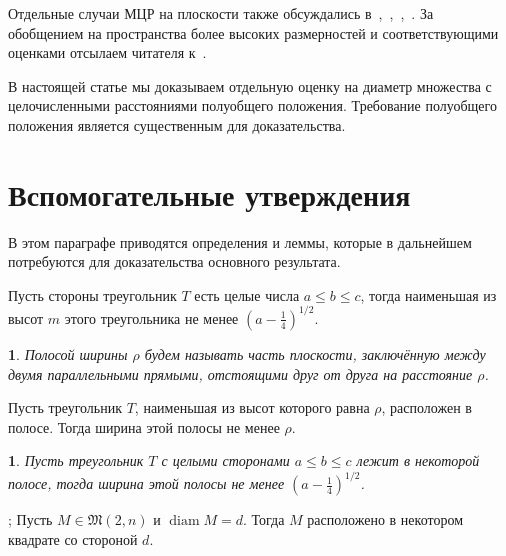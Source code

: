 \documentclass[11pt,twoside,draft
]{article}
\newtheorem{Definition}{\indent {\sc Definition}}
\newtheorem{Corollary}{\indent {\sc Corollary}}
\begin{document}
Отдельные случаи МЦР на плоскости также обсуждались
в~\cite[\S 5.11]{brass2006research},~\cite[\S D20]{guy2013unsolved},~\cite{our-pmm-2018},~\cite{our-ped-2018}.
За обобщением на пространства более высоких размерностей и соответствующими оценками
отсылаем читателя к~\cite{kurz2005characteristic,nozaki2013lower}.

В настоящей статье мы доказываем отдельную оценку на диаметр множества с целочисленными расстояниями полуобщего положения.
Требование полуобщего положения является существенным для доказательства.



\section{Вспомогательные утверждения}

В этом параграфе приводятся определения и леммы, которые в дальнейшем потребуются
для доказательства основного результата.


\begin{lemma}
	\cite[Наблюдение 1]{solymosi2003note}
	Пусть стороны треугольник $T$ есть целые числа $a \leq b \leq c$,
	тогда наименьшая из высот $m$ этого треугольника не менее $\left(a - \frac{1}{4}\right)^{1/2}$.
\end{lemma}

\begin{Definition}
	Полосой ширины $\rho$ будем называть часть плоскости,
	заключённую между двумя параллельными прямыми,
	отстоящими друг от друга на расстояние $\rho$.
\end{Definition}

\begin{lemma}
	\cite{smurov1998stripcoverings}
	Пусть треугольник $T$, наименьшая из высот которого равна $\rho$, расположен в полосе.
	Тогда ширина этой полосы не менее $\rho$.
\end{lemma}

\begin{Corollary}
	\label{cor:solymosi_strip}
	Пусть треугольник $T$ с целыми сторонами $a \leq b \leq c$ лежит в некоторой полосе,
	тогда ширина этой полосы не менее $\left(a - \frac{1}{4}\right)^{1/2}$.
\end{Corollary}


\begin{lemma}
	\cite[Lemma 4]{our-vmmsh-2018};
	\cite[Lemma 2.4]{my-pps-linear-bound-2019}
	\label{lem:square_container}
	Пусть $M\in\mathfrak{M}(2,n)$ и $\operatorname{diam} M = d$.
	Тогда $M$ расположено в некотором квадрате со стороной $d$.
\end{lemma}
\end{document}
